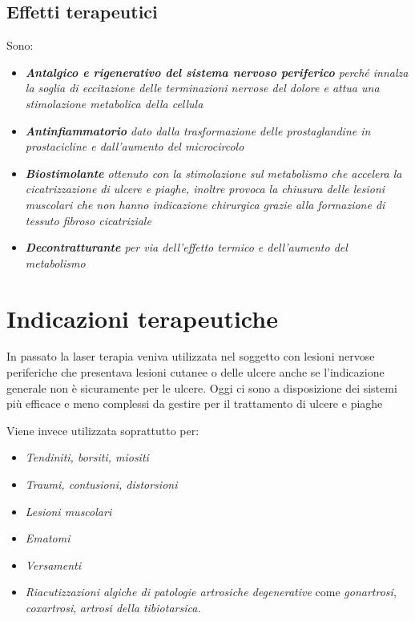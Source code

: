 \subsection{Effetti terapeutici}
Sono:
\begin{itemize}
\item \emph{\textbf{Antalgico e rigenerativo del sistema nervoso periferico}
perché innalza la soglia di eccitazione delle terminazioni nervose del
dolore e attua una stimolazione metabolica della cellula}
\item \emph{\textbf{Antinfiammatorio} dato dalla trasformazione delle
prostaglandine in prostacicline e dall'aumento del microcircolo}
\item \emph{\textbf{Biostimolante} ottenuto con la stimolazione sul
metabolismo che accelera la cicatrizzazione di ulcere e piaghe, inoltre
provoca la chiusura delle lesioni muscolari che non hanno indicazione
chirurgica grazie alla formazione di tessuto fibroso cicatriziale}
\item \emph{\textbf{Decontratturante} per via dell'effetto termico e
dell'aumento del metabolismo}
\end{itemize}

\section{Indicazioni terapeutiche}

In passato la laser terapia veniva utilizzata nel soggetto con lesioni
nervose periferiche che presentava lesioni cutanee o delle ulcere anche
se l'indicazione generale non è sicuramente per le ulcere. Oggi ci sono
a disposizione dei sistemi più efficace e meno complessi da gestire per
il trattamento di ulcere e piaghe

Viene invece utilizzata soprattutto per:

\begin{itemize}
\item
  \emph{Tendiniti, borsiti, miositi}
\item
  \emph{Traumi, contusioni, distorsioni}
\item
  \emph{Lesioni muscolari}
\item
  \emph{Ematomi}
\item
  \emph{Versamenti}
\item
  \emph{Riacutizzazioni algiche di patologie artrosiche degenerative}
  come \emph{gonartrosi}, \emph{coxartrosi}, \emph{artrosi della
  tibiotarsica.}
\end{itemize}


